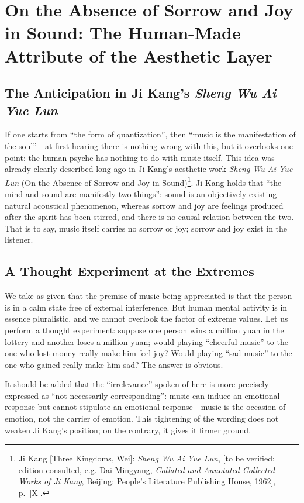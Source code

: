 \documentclass[11pt,a4paper]{article}
\begin{document}
\section{On the Absence of Sorrow and Joy in Sound: The Human-Made Attribute of the Aesthetic Layer}

\subsection{The Anticipation in Ji Kang's \textit{Sheng Wu Ai Yue Lun}}

If one starts from ``the form of quantization'', then ``music is the manifestation of the
soul''---at first hearing there is nothing wrong with this, but it overlooks one point:
the human psyche has nothing to do with music itself. This idea was already clearly
described long ago in Ji Kang's aesthetic work \textit{Sheng Wu Ai Yue Lun} (On the Absence
of Sorrow and Joy in Sound)\footnote{Ji Kang [Three Kingdoms, Wei]: \textit{Sheng Wu Ai
Yue Lun}, [to be verified: edition consulted, e.g. Dai Mingyang, \textit{Collated and
Annotated Collected Works of Ji Kang}, Beijing: People's Literature Publishing House,
1962], p.~[X].}. Ji Kang holds that ``the mind and sound are manifestly two things'': sound
is an objectively existing natural acoustical phenomenon, whereas sorrow and joy are
feelings produced after the spirit has been stirred, and there is no causal relation
between the two. That is to say, music itself carries no sorrow or joy; sorrow and joy
exist in the listener.

\subsection{A Thought Experiment at the Extremes}

We take as given that the premise of music being appreciated is that the person is in a
calm state free of external interference. But human mental activity is in essence
pluralistic, and we cannot overlook the factor of extreme values. Let us perform a thought
experiment: suppose one person wins a million yuan in the lottery and another loses a
million yuan; would playing ``cheerful music'' to the one who lost money really make him
feel joy? Would playing ``sad music'' to the one who gained really make him sad? The
answer is obvious.

It should be added that the ``irrelevance'' spoken of here is more precisely expressed as
``not necessarily corresponding'': music can induce an emotional response but cannot
stipulate an emotional response---music is the occasion of emotion, not the carrier of
emotion. This tightening of the wording does not weaken Ji Kang's position; on the
contrary, it gives it firmer ground.
\end{document}
